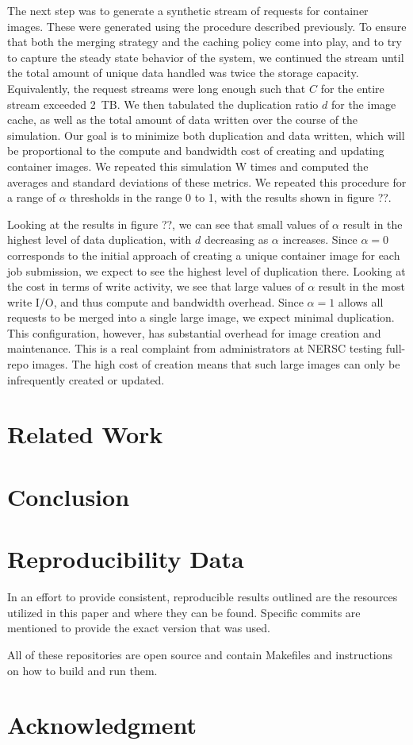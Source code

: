 \documentclass[sigconf]{acmart}
\begin{document}
The next step was to generate a synthetic stream of requests for container images.
These were generated using the procedure described previously.
To ensure that both the merging strategy and the caching policy come into play,
and to try to capture the steady state behavior of the system,
we continued the stream until the total amount of unique data handled was twice the storage capacity.
Equivalently, the request streams were long enough such that $C$ for the entire stream exceeded 2~TB.
We then tabulated the duplication ratio $d$ for the image cache,
as well as the total amount of data written over the course of the simulation.
Our goal is to minimize both duplication and data written,
which will be proportional to the compute and bandwidth cost of creating and updating container images.
We repeated this simulation W times and computed the averages and standard deviations of these metrics.
We repeated this procedure for a range of $\alpha$ thresholds in the range 0 to 1,
with the results shown in figure ??.

Looking at the results in figure ??,
we can see that small values of $\alpha$ result in the highest level of data duplication,
with $d$ decreasing as $\alpha$ increases.
Since $\alpha=0$ corresponds to the initial approach of creating a unique container image for each job submission,
we expect to see the highest level of duplication there.
Looking at the cost in terms of write activity,
we see that large values of $\alpha$ result in the most write I/O,
and thus compute and bandwidth overhead.
Since $\alpha=1$ allows all requests to be merged into a single large image,
we expect minimal duplication.
This configuration, however,
has substantial overhead for image creation and maintenance.
This is a real complaint from administrators at NERSC testing full-repo images.
The high cost of creation means that such large images can only be infrequently created or updated.


\section{Related Work}

\section{Conclusion}


\section{Reproducibility Data}

In an effort to provide consistent, reproducible results outlined are the
resources utilized in this paper and where they can be found.
Specific commits are mentioned to provide the exact version that was used.


All of these repositories are open source and contain Makefiles
and instructions on how to build and run them.

\section*{Acknowledgment}




\end{document}
